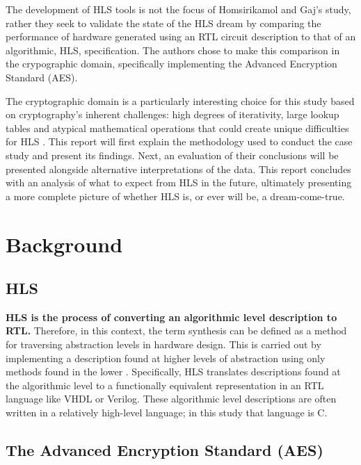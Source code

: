 \documentclass[12pt,journal,compsoc,onecolumn]{IEEEtran}
\begin{document}
The development of HLS tools is not the focus of Homsirikamol and Gaj's study, rather they seek to validate the state of the HLS dream by comparing the performance of hardware generated using an RTL circuit description to that of an algorithmic, HLS, specification. The authors chose to make this comparison in the crypographic domain, specifically implementing the Advanced Encryption Standard (AES). 

The cryptographic domain is a particularly interesting choice for this study based on cryptography's inherent challenges: high degrees of iterativity, large lookup tables and atypical mathematical operations that could create unique difficulties for HLS \cite{sel}. This report will first explain the methodology used to conduct the case study and present its findings. Next, an evaluation of their conclusions will be presented alongside alternative interpretations of the data. This report concludes with an analysis of what to expect from HLS in the future, ultimately presenting a more complete picture of whether HLS is, or ever will be, a dream-come-true.

\section{Background}
\subsection{HLS}\label{sec:hls}

\textbf{HLS is the process of converting an algorithmic level description to RTL.} Therefore, in this context, the term synthesis can be defined as a method for traversing abstraction levels in hardware design. This is carried out by implementing a description found at higher levels of abstraction using only methods found in the lower \cite{churtl}. Specifically, HLS translates descriptions found at the algorithmic level to a functionally equivalent representation in an RTL language like VHDL or Verilog. These algorithmic level descriptions are often written in a relatively high-level language; in this study that language is C. 

\subsection{The Advanced Encryption Standard (AES)}
\end{document}
